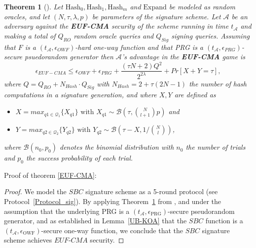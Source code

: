 \documentclass[english]{article}
\newtheorem{theorem}{Theorem}[section]
\begin{document}
	\begin{theorem}[\cite{feneu2023}]\label{theorem_feneu}
		Let $\text{Hash}_0, \text{Hash}_1, \text{Hash}_m$ and $\text{Expand}$ be modeled as random oracles, and let $(N, \tau, \lambda, p)$ be parameters of the signature scheme. Let $\mathcal{A}$ be an adversary against the \textbf{EUF-CMA} security of the scheme running in time $t_{\mathcal{A}}$ and making a total of $Q_{RO}$ random oracle queries and $Q_{Sig}$ signing queries. Assuming that $F$ is a $(t_{\mathcal{A}}, \epsilon_{OWF})$-hard one-way function and that PRG is a $(t_{\mathcal{A}}, \epsilon_{PRG})$-secure psuedorandom generator then $\mathcal{A}$'s advantage in the \textbf{EUF-CMA} game is
		$$
			\epsilon_{EUF-CMA} \leq \epsilon_{OWF} + \epsilon_{PRG} + \frac{(\tau N + 2)Q^2}{2^{2\lambda}} + Pr[X+Y = \tau],
		$$
		where $Q = Q_{RO} + N_{Hash} \cdot Q_{Sig}$ with $N_{Hash} = 2 + \tau(2N - 1)$ the number of hash computations in a signature generation, and where $X, Y$ are defined as
		\begin{itemize}
			\item $X = max_{q1 \in \mathcal{Q}_1} \{X_{q1}\} \text{ with } X_{q1} \sim \mathcal{B}\left(\tau, \binom{N}{l+1}p\right)$ and
			\item $Y = max_{q2 \in \mathcal{Q}_2} \{Y_{q2}\} \text{ with } Y_{q2} \sim \mathcal{B}\left(\tau - X, 1 / \binom{N}{l}\right)$,
		\end{itemize}
		where $\mathcal{B}(n_0, p_0)$ denotes the binomial distribution with $n_0$ the number of trials and $p_0$ the success probability of each trial.
	\end{theorem}
	
	Proof of theorem \ref{EUF-CMA}:
	\begin{proof}
		We model the $SBC$ signature scheme \cite{HJ23} as a 5-round protocol (see Protocol~\ref{Protocol_sig}). By applying Theorem~\ref{theorem_feneu} from \cite{feneu2023}, and under the assumption that the underlying PRG is a $(t_{\mathcal{A}}, \epsilon_{\mathrm{PRG}})$-secure pseudorandom generator, and as established in Lemma~\ref{UB-KOA} that the $SBC$ function is a $(t_{\mathcal{A}}, \epsilon_{\mathrm{OWF}})$-secure one-way function, we conclude that the $SBC$ signature scheme achieves $EUF$-$CMA$ security.
	\end{proof}
\end{document}
